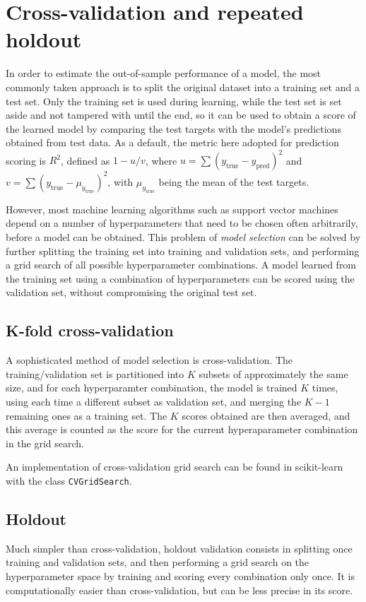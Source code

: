 \documentclass[12pt]{report}
\begin{document}
\section{Cross-validation and repeated holdout} \label{cvalreph}
In order to estimate the out-of-sample performance of a model, the most commonly taken approach is to split the original dataset into a training set and a test set. Only the training set is used during learning, while the test set is set aside and not tampered with until the end, so it can be used to obtain a score of the learned model by comparing the test targets with the model's predictions obtained from test data. As a default, the metric here adopted for prediction scoring is $R^2$, defined as $1 - u/v$, where $u = \sum(y_{\text{true}} - y_{\text{pred}})^2$ and $v = \sum(y_{\text{true}} - \mu_{y_{\text{true}}})^2$, with $\mu_{y_{\text{true}}}$ being the mean of the test targets.

However, most machine learning algorithms such as support vector machines depend on a number of hyperparameters that need to be chosen often arbitrarily, before a model can be obtained. This problem of \textit{model selection} can be solved by further splitting the training set into training and validation sets, and performing a grid search of all possible hyperparameter combinations. A model learned from the training set using a combination of hyperparameters can be scored using the validation set, without compromising the original test set.

\subsection*{K-fold cross-validation}
A sophisticated method of model selection is cross-validation. The training/validation set is partitioned into $ K $ subsets of approximately the same size, and for each hyperparamter combination, the model is trained $ K $ times, using each time a different subset as validation set, and merging the $ K - 1 $ remaining ones as a training set. The $ K $ scores obtained are then averaged, and this average is counted as the score for the current hyperaparameter combination in the grid search.

An implementation of cross-validation grid search can be found in scikit-learn with the class \texttt{CVGridSearch}.

\subsection*{Holdout}
Much simpler than cross-validation, holdout validation consists in splitting once training and validation sets, and then performing a grid search on the hyperparameter space by training and scoring every combination only once. It is computationally easier than cross-validation, but can be less precise in its score.
\end{document}
